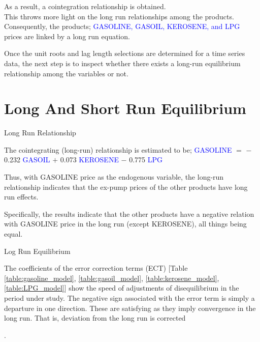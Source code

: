 \documentclass{beamer}
\newcommand{\vspaceFive}{\vspace{5pt}}
\newcommand{\vspaceTen}{\vspace{10pt}}
\newcommand{\textHighlight}[1]{\textcolor{blue}{#1}}
\begin{document}
	\begin{frame}
		\begin{block}{}
			As a result, a cointegration relationship is obtained. \\ 
			This throws more light on the long run relationships among the products.\\
			 Consequently, the products; \textHighlight{GASOLINE, GASOIL, KEROSENE, and LPG} prices are linked by a 
			long run equation. 
		\end{block}
	
		\begin{block}{}
			Once the unit roots and lag length selections are determined for a time series data, the next step is to inspect whether there exists a long-run equilibrium relationship among the variables or not.
		\end{block}
	\end{frame}
		
	
	\section{Long And Short Run Equilibrium}
	\begin{frame}{Long Run Relationship}
		\begin{block}{The cointegrating (long-run) relationship is estimated to be;}
			\vspaceFive
			\textHighlight{GASOLINE} $ = $ $-$ 0.232 \textHighlight{GASOIL} $ + $  0.073 \textHighlight{KEROSENE} $-$ 0.775 \textHighlight{LPG}
			\vspaceFive 
		\end{block} 
		\vspaceFive
		
		Thus, with GASOLINE price as the endogenous variable, the long-run relationship indicates that the ex-pump prices of the other products have long run effects. \\ \vspaceTen
		
		Specifically, the results indicate that the other products have a negative relation with GASOLINE price in the long run (except KEROSENE), all things being equal.
	\end{frame}

	\begin{frame}{Log Run Equilibrium}
		\begin{block}{}
			The coefficients of the error correction terms (ECT) [Table \ref{table:gasoline_model}, \ref{table:gasoil_model}, \ref{table:kerosene_model}, \ref{table:LPG_model}] show the speed of adjustments of disequilibrium in the period under study. The negative sign associated with the error term is simply a departure in one direction. These are satisfying as they imply convergence in the long run. That is, deviation from the long run is corrected
		\end{block}.
	\end{frame}
\end{document}
